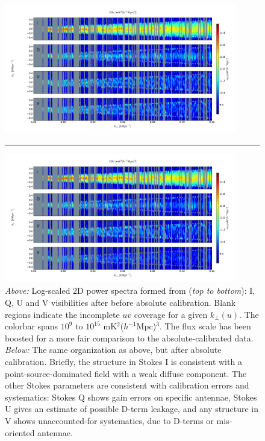 \begin{figure}[h!]
\centering
\includegraphics[width=0.9\textwidth]{chapters/eor_window_PAPER/figures/oldcal_forks_lines.pdf}
\noindent\rule{14cm}{0.6pt}
\includegraphics[width=0.9\textwidth]{chapters/eor_window_PAPER/figures/newcal_forks_lines.pdf}
\caption[Log-scaled 2D power spectra from PAPER-32.]{\textit{Above:} Log-scaled 2D power spectra formed from (\textit{top to bottom}): I, Q, U and V visibilities after before absolute calibration. Blank regions indicate the incomplete $uv$ coverage for a given $k_{\perp}(u)$. 
The colorbar spans $10^{9}$ to $10^{15}$ mK$^2$($h^{-1}$Mpc)$^3$. The flux scale has been boosted for a more fair comparison to the absolute-calibrated data.
\textit{Below:} The same organization as above, but after absolute calibration.
Briefly, the structure in Stokes I is consistent with a point-source-dominated field with a weak diffuse component. The other Stokes parameters are consistent with calibration errors and systematics: Stokes Q shows gain errors on specific antennae, Stokes U gives an estimate of possible D-term leakage, and any structure in V shows unaccounted-for systematics, due to D-terms or mis-oriented antennae.}
\label{fig:forks}
\end{figure}

